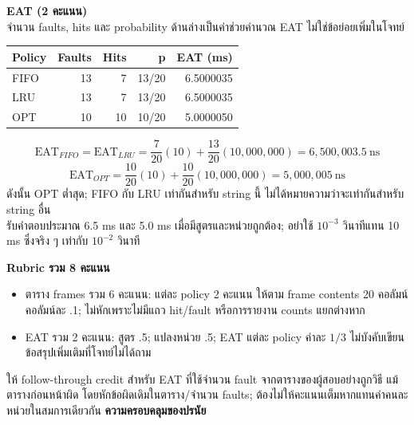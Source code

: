 \noindent\textbf{EAT (2 คะแนน)}\\จำนวน faults, hits และ probability ด้านล่างเป็นค่าช่วยคำนวณ EAT ไม่ใช่ข้อย่อยเพิ่มในโจทย์
\begin{center}\renewcommand{\arraystretch}{1.15}\begin{tabular}{lrrrr}
Policy & Faults & Hits & p & EAT (ms)\\\hline
FIFO & 13 & 7 & 13/20 & 6.5000035\\
LRU & 13 & 7 & 13/20 & 6.5000035\\
OPT & 10 & 10 & 10/20 & 5.0000050\\
\end{tabular}\end{center}
\[\mathrm{EAT}_{FIFO}=\mathrm{EAT}_{LRU}=\frac7{20}(10)+\frac{13}{20}(10{,}000{,}000)=6{,}500{,}003.5\ \mathrm{ns}\]
\[\mathrm{EAT}_{OPT}=\frac{10}{20}(10)+\frac{10}{20}(10{,}000{,}000)=5{,}000{,}005\ \mathrm{ns}\]
\noindent ดังนั้น OPT ต่ำสุด; FIFO กับ LRU เท่ากันสำหรับ string นี้ ไม่ได้หมายความว่าจะเท่ากันสำหรับ string อื่น\\รับคำตอบประมาณ 6.5 ms และ 5.0 ms เมื่อมีสูตรและหน่วยถูกต้อง; อย่าใช้ $10^{-3}$ วินาทีแทน 10 ms ซึ่งจริง ๆ เท่ากับ $10^{-2}$ วินาที
\par\medskip
\noindent\textbf{Rubric รวม 8 คะแนน}
\begin{itemize}[leftmargin=1.4em,itemsep=.18cm]
\item ตาราง frames รวม 6 คะแนน: แต่ละ policy 2 คะแนน ให้ตาม frame contents 20 คอลัมน์ คอลัมน์ละ .1; ไม่หักเพราะไม่มีแถว hit/fault หรือการรายงาน counts แยกต่างหาก
\item EAT รวม 2 คะแนน: สูตร .5; แปลงหน่วย .5; EAT แต่ละ policy ค่าละ $1/3$ ไม่บังคับเขียนข้อสรุปเพิ่มเติมที่โจทย์ไม่ได้ถาม
\end{itemize}
\noindent ให้ follow-through credit สำหรับ EAT ที่ใช้จำนวน fault จากตารางของผู้สอบอย่างถูกวิธี แม้ตารางก่อนหน้าผิด โดยหักข้อผิดเดิมในตาราง/จำนวน faults; ต้องไม่ให้คะแนนเต็มหากแทนค่าคนละหน่วยในสมการเดียวกัน
\newpage{}
\noindent\textbf{ความครอบคลุมของปรนัย}

